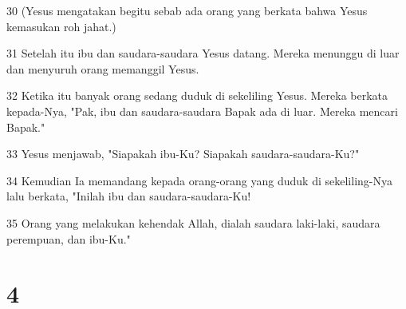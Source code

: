 \par 30 (Yesus mengatakan begitu sebab ada orang yang berkata bahwa Yesus kemasukan roh jahat.)
\par 31 Setelah itu ibu dan saudara-saudara Yesus datang. Mereka menunggu di luar dan menyuruh orang memanggil Yesus.
\par 32 Ketika itu banyak orang sedang duduk di sekeliling Yesus. Mereka berkata kepada-Nya, "Pak, ibu dan saudara-saudara Bapak ada di luar. Mereka mencari Bapak."
\par 33 Yesus menjawab, "Siapakah ibu-Ku? Siapakah saudara-saudara-Ku?"
\par 34 Kemudian Ia memandang kepada orang-orang yang duduk di sekeliling-Nya lalu berkata, "Inilah ibu dan saudara-saudara-Ku!
\par 35 Orang yang melakukan kehendak Allah, dialah saudara laki-laki, saudara perempuan, dan ibu-Ku."

\chapter{4}

